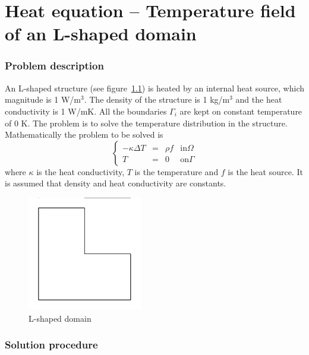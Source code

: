 \chapter{Heat equation -- Temperature field of an L-shaped domain}



\subsection*{Problem description}

An L-shaped structure 
(see figure~\ref{fg:struct1}) 
is heated by an
internal heat source, which magnitude is 1 W/m$^3$. The density of the
structure is 1 kg/m$^3$ and the heat conductivity is 1 W/mK. All the
boundaries $\Gamma_i$ are kept on constant temperature of 0 K. The
problem is to solve the temperature distribution in the structure.
Mathematically the problem to be solved is
\begin{equation}
\left \{
\begin{array}{cccc}
- \kappa \Delta T &= &\rho f & \mathrm{ in } \Omega \\
T&=&0 & \mathrm{ on } \Gamma
\end{array}
\right .
\end{equation}
where $\kappa$ is the heat conductivity, $T$  is the temperature 
and $f$ is the heat source. It is assumed that density 
and heat conductivity are constants. 
\begin{figure}
\begin{center}
\includegraphics[width=50mm, viewport=20 20 580 580,clip]{angle}
\caption{L-shaped domain}\label{fg:struct1}
\end{center}
\end{figure}

\subsection*{Solution procedure}

